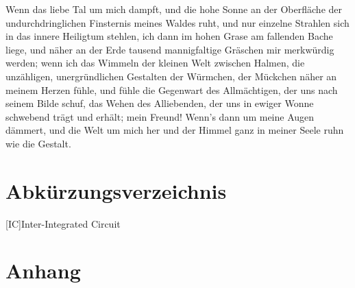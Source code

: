 \documentclass[a4paper,12pt]{article}
\begin{document}
Wenn das liebe Tal um mich dampft, und die hohe Sonne an der Oberfläche der undurchdringlichen Finsternis meines Waldes ruht, und nur einzelne Strahlen sich in das innere Heiligtum stehlen, ich dann im hohen Grase am fallenden Bache liege, und näher an der Erde tausend mannigfaltige Gräschen mir merkwürdig werden; wenn ich das Wimmeln der kleinen Welt zwischen Halmen, die unzähligen, unergründlichen Gestalten der Würmchen, der Mückchen näher an meinem Herzen fühle, und fühle die Gegenwart des Allmächtigen, der uns nach seinem Bilde schuf, das Wehen des Alliebenden, der uns in ewiger Wonne schwebend trägt und erhält; mein Freund! Wenn's dann um meine Augen dämmert, und die Welt um mich her und der Himmel ganz in meiner Seele ruhn wie die Gestalt.
\newpage
{}
\tableofcontents
\newpage

\newpage
{}
\printbibliography
\newpage
\renewcommand{\indexname}{Stichwortverzeichnis}
\printindex
{}
\newpage
\section*{Abkürzungsverzeichnis}
\begin{acronym}[Bash]
 [IC]{Inter-Integrated Circuit}
\end{acronym}
\newpage
{}
\listoffigures
\newpage
{}
\listoftables
\newpage
\section*{Anhang}
\end{document}
